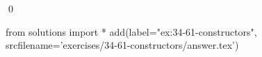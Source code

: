 
\begin{ex}
  \label{ex:34-61-constructors}
  
  \qed
\end{ex}
\begin{python0}
from solutions import *
add(label="ex:34-61-constructors",
    srcfilename='exercises/34-61-constructors/answer.tex')
\end{python0}
